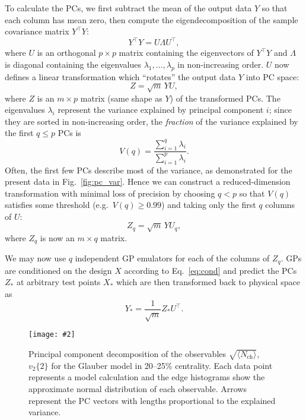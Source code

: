 \documentclass[aps,prc,reprint,superscriptaddress,amsmath]{revtex4-1}
\newcommand{\colfig}[3][t]{
  \begin{figure}[#1]
    \texttt{[image: \#2]}
    \caption{\label{fig:#2}#3}
  \end{figure}
}
\newcommand{\avg}[1]{\langle #1 \rangle}
\newcommand{\nch}{N_\text{ch}}
\newcommand{\vnk}[2]{v_#1\{#2\}}
\newcommand{\tran}{^\intercal}
\begin{document}
To calculate the PCs, we first subtract the mean of the output data $Y$ so that each column has mean zero, then compute the eigendecomposition of the sample covariance matrix $Y\tran Y$:
\begin{equation}
  Y\tran Y = U \Lambda U\tran,
  \label{eq:cov}
\end{equation}
where $U$ is an orthogonal $p \times p$ matrix containing the eigenvectors of $Y\tran Y$ and $\Lambda$ is diagonal containing the eigenvalues $\lambda_1, \ldots, \lambda_p$ in non-increasing order.
$U$ now defines a linear transformation which ``rotates'' the output data $Y$ into PC space:
\begin{equation}
  Z = \sqrt m \, YU,
\end{equation}
where $Z$ is an $m \times p$ matrix (same shape as $Y$) of the transformed PCs.
The eigenvalues $\lambda_i$ represent the variance explained by principal component $i$; since they are sorted in non-increasing order, the \emph{fraction} of the variance explained by the first $q \leq p$ PCs is
\begin{equation}
  V(q) = \frac{\sum_{i=1}^q \lambda_i}{\sum_{i=1}^p \lambda_i}.
\end{equation}
Often, the first few PCs describe most of the variance, as demonstrated for the present data in Fig.~\ref{fig:pc_var}.
Hence we can construct a reduced-dimension transformation with minimal loss of precision by choosing $q < p$ so that $V(q)$ satisfies some threshold (e.g.~$V(q) \geq 0.99$) and taking only the first $q$ columns of $U$:
\begin{equation}
  Z_q = \sqrt m \, YU_q,
\end{equation}
where $Z_q$ is now an $m \times q$ matrix.

We may now use $q$ independent GP emulators for each of the columns of $Z_q$.
GPs are conditioned on the design $X$ according to Eq.~\eqref{eq:cond} and predict the PCs $Z_*$ at arbitrary test points $X_*$ which are then transformed back to physical space as
\begin{equation}
  Y_* = \frac{1}{\sqrt m} Z_* U\tran.
\end{equation}

\colfig[b]{pc_scatter}{
  Principal component decomposition of the observables $\sqrt{\avg\nch}$, $\vnk 2 2$ for the Glauber model in 20--25\% centrality.
  Each data point represents a model calculation and the edge histograms show the approximate normal distribution of each observable.
  Arrows represent the PC vectors with lengths proportional to the explained variance.
}
\end{document}
